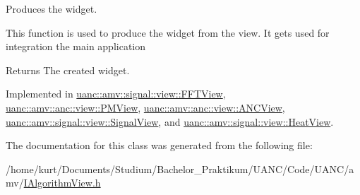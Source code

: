 Produces the widget. 

This function is used to produce the widget from the view. It gets used for integration the main application

\begin{DoxyReturn}{Returns}
The created widget. 
\end{DoxyReturn}


Implemented in \hyperlink{classuanc_1_1amv_1_1signal_1_1view_1_1_f_f_t_view_a774599a51059f878472cf72e2ce4b2b2}{uanc\+::amv\+::signal\+::view\+::\+F\+F\+T\+View}, \hyperlink{classuanc_1_1amv_1_1anc_1_1view_1_1_p_m_view_a4f4d6f52427201d7dcd671c7932824ad}{uanc\+::amv\+::anc\+::view\+::\+P\+M\+View}, \hyperlink{classuanc_1_1amv_1_1anc_1_1view_1_1_a_n_c_view_ab8ad6046c26c2eae15edc82fdbae9aa1}{uanc\+::amv\+::anc\+::view\+::\+A\+N\+C\+View}, \hyperlink{classuanc_1_1amv_1_1signal_1_1view_1_1_signal_view_a8b42dd84baf3c0730640ddb87db69735}{uanc\+::amv\+::signal\+::view\+::\+Signal\+View}, and \hyperlink{classuanc_1_1amv_1_1signal_1_1view_1_1_heat_view_a93ac20354fa17ab67e368e324f240c9a}{uanc\+::amv\+::signal\+::view\+::\+Heat\+View}.



The documentation for this class was generated from the following file\+:\begin{DoxyCompactItemize}
\item 
/home/kurt/\+Documents/\+Studium/\+Bachelor\+\_\+\+Praktikum/\+U\+A\+N\+C/\+Code/\+U\+A\+N\+C/amv/\hyperlink{_i_algorithm_view_8h}{I\+Algorithm\+View.\+h}\end{DoxyCompactItemize}
